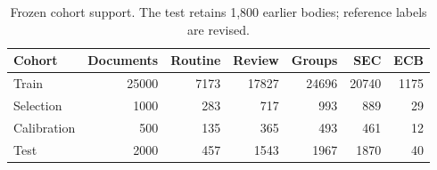 \begin{table}[!htbp]
\centering
\caption{Frozen cohort support. The test retains 1,800 earlier bodies; reference labels are revised.}
\label{tab:data}
\small
\setlength{\tabcolsep}{3.5pt}
\begin{tabularx}{\linewidth}{@{}Xrrrrrr@{}}
\toprule
Cohort & Documents & Routine & Review & Groups & SEC & ECB\\
\midrule
Train & 25000 & 7173 & 17827 & 24696 & 20740 & 1175\\
Selection & 1000 & 283 & 717 & 993 & 889 & 29\\
Calibration & 500 & 135 & 365 & 493 & 461 & 12\\
Test & 2000 & 457 & 1543 & 1967 & 1870 & 40\\
\bottomrule
\end{tabularx}
\end{table}
